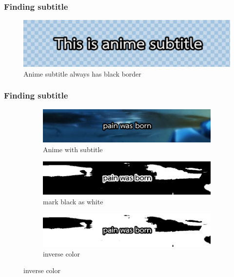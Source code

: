 \documentclass[xcolor=dvipsnames, xetex,serif]{beamer}
\begin{document}
    \begin{frame}
        \frametitle{Finding subtitle}
        \begin{figure}[H]
            \centering
            \includegraphics[width=0.8\linewidth]{images/subtitle-remove/thisisanimesubtitle.png}
            \caption{Anime subtitle always has black border}
        \end{figure}
    \end{frame}
    \begin{frame}
        \frametitle{Finding subtitle}
        \begin{figure}[H]
            \begin{subfigure}{0.4\linewidth}
                \centering
                \includegraphics[width=0.8\linewidth]{images/subtitle_detection/detection-original.png}
                \caption{Anime with subtitle}
            \end{subfigure}
            \begin{subfigure}{0.4\linewidth}
                \centering
                \includegraphics[width=0.8\linewidth]{images/subtitle_detection/detection-threshold.png}
                \caption{mark black as white}
            \end{subfigure}
            \begin{subfigure}{0.4\linewidth}
                \centering
                \includegraphics[width=0.8\linewidth]{images/subtitle_detection/detection-inverse.png}
                \caption{inverse color}

\end{subfigure}
\end{figure}
\end{frame}
\end{document}
